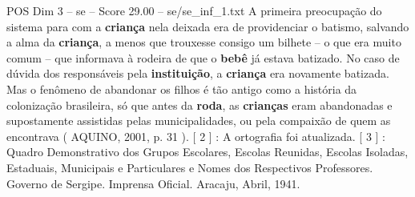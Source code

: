 \begin{textsample}{POS Dim 3 – se – Score 29.00 – se/se\_inf\_1.txt}
A primeira preocupação do sistema para com a \textbf{criança} nela deixada era de providenciar o batismo, salvando a alma da \textbf{criança}, a menos que trouxesse consigo um bilhete – o que era muito comum – que informava à rodeira de que o \textbf{bebê} já estava batizado.
No caso de dúvida dos responsáveis pela \textbf{instituição}, a \textbf{criança} era novamente batizada.
Mas o fenômeno de abandonar os filhos é tão antigo como a história da colonização brasileira, só que antes da \textbf{roda}, as \textbf{crianças} eram abandonadas e supostamente assistidas pelas municipalidades, ou pela compaixão de quem as encontrava ( AQUINO, 2001, p. 31 ). [ 2 ] : A ortografia foi atualizada. [ 3 ] : Quadro Demonstrativo dos Grupos Escolares, Escolas Reunidas, Escolas Isoladas, Estaduais, Municipais e Particulares e Nomes dos Respectivos Professores.
Governo de Sergipe.
Imprensa Oficial.
Aracaju, Abril, 1941.

\end{textsample}

